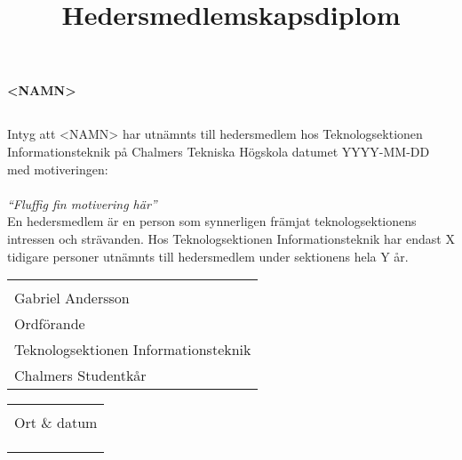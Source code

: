 \documentclass[11pt, noincludeaddress, nopagination]{classes/cthit}
\makeatletter
\newcommand{\sign}[4]{%
  \begin{tabular}[t]{@{}l@{}}
  \makebox[6.5cm]{\dotfill}\\
  \strut#1\strut \\
  \strut#2\strut \\
  \strut#3\strut \\
  \strut#4\strut \\
  \end{tabular}%
}
\makeatother
\begin{document}
\title{Hedersmedlemskapsdiplom}

\makeheadfoot%

\makesimpletitle
\begin{center}
\textbf{\Huge{<NAMN>}}
\end{center}
\vspace{1cm}
\subsection*{}
Intyg att <NAMN> har utnämnts till hedersmedlem hos Teknologsektionen Informationsteknik på Chalmers Tekniska Högskola datumet YYYY-MM-DD med motiveringen: 
\\
\\
\textit{
``Fluffig fin motivering här''
}
\\

En hedersmedlem är en person som synnerligen främjat teknologsektionens intressen och strävanden. Hos Teknologsektionen Informationsteknik har endast X tidigare personer utnämnts till hedersmedlem under sektionens hela Y år.

\vspace{4cm} 

\noindent
  \begin{minipage}[t]{0.5\linewidth}
    \raggedright
    \sign{Gabriel Andersson}{Ordförande}{Teknologsektionen Informationsteknik}{Chalmers Studentkår}
  \end{minipage}%
  \hfill
  \begin{minipage}[t]{0.5\linewidth}
  \sign{Ort \& datum}{}{}{}
  \end{minipage}
\end{document}
